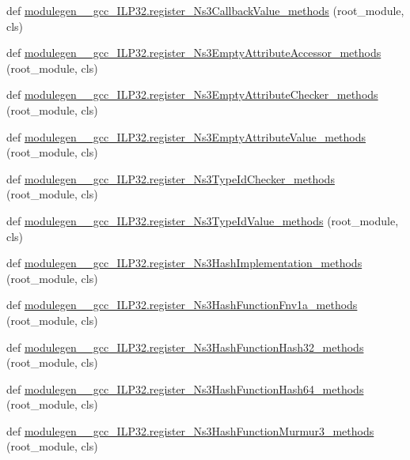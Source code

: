 \begin{DoxyCompactItemize}
\item 
def \hyperlink{namespacemodulegen____gcc__ILP32_a08e2760d3ccd91256fbce9ef63b1e10b}{modulegen\+\_\+\+\_\+gcc\+\_\+\+I\+L\+P32.\+register\+\_\+\+Ns3\+Callback\+Value\+\_\+methods} (root\+\_\+module, cls)
\item 
def \hyperlink{namespacemodulegen____gcc__ILP32_a489a942ef59028089c93b9dea61069a3}{modulegen\+\_\+\+\_\+gcc\+\_\+\+I\+L\+P32.\+register\+\_\+\+Ns3\+Empty\+Attribute\+Accessor\+\_\+methods} (root\+\_\+module, cls)
\item 
def \hyperlink{namespacemodulegen____gcc__ILP32_a46ed8d8e239b38c1a4353a533fcb77a2}{modulegen\+\_\+\+\_\+gcc\+\_\+\+I\+L\+P32.\+register\+\_\+\+Ns3\+Empty\+Attribute\+Checker\+\_\+methods} (root\+\_\+module, cls)
\item 
def \hyperlink{namespacemodulegen____gcc__ILP32_a4f1a7f7e506590df165bd2f16ec88878}{modulegen\+\_\+\+\_\+gcc\+\_\+\+I\+L\+P32.\+register\+\_\+\+Ns3\+Empty\+Attribute\+Value\+\_\+methods} (root\+\_\+module, cls)
\item 
def \hyperlink{namespacemodulegen____gcc__ILP32_a8cc76f23a8cb33ad3a0e4d77e8fbee0a}{modulegen\+\_\+\+\_\+gcc\+\_\+\+I\+L\+P32.\+register\+\_\+\+Ns3\+Type\+Id\+Checker\+\_\+methods} (root\+\_\+module, cls)
\item 
def \hyperlink{namespacemodulegen____gcc__ILP32_a39c112d1c935b295e15786cb622c73a5}{modulegen\+\_\+\+\_\+gcc\+\_\+\+I\+L\+P32.\+register\+\_\+\+Ns3\+Type\+Id\+Value\+\_\+methods} (root\+\_\+module, cls)
\item 
def \hyperlink{namespacemodulegen____gcc__ILP32_acbacaf626a5a437cc46ab734cfde3cb8}{modulegen\+\_\+\+\_\+gcc\+\_\+\+I\+L\+P32.\+register\+\_\+\+Ns3\+Hash\+Implementation\+\_\+methods} (root\+\_\+module, cls)
\item 
def \hyperlink{namespacemodulegen____gcc__ILP32_a8a8387218e2c3d882054e6b56a6a4b07}{modulegen\+\_\+\+\_\+gcc\+\_\+\+I\+L\+P32.\+register\+\_\+\+Ns3\+Hash\+Function\+Fnv1a\+\_\+methods} (root\+\_\+module, cls)
\item 
def \hyperlink{namespacemodulegen____gcc__ILP32_afac315fff05eebcf56ca0655484fb790}{modulegen\+\_\+\+\_\+gcc\+\_\+\+I\+L\+P32.\+register\+\_\+\+Ns3\+Hash\+Function\+Hash32\+\_\+methods} (root\+\_\+module, cls)
\item 
def \hyperlink{namespacemodulegen____gcc__ILP32_a5bb0479ce8e16c48c18c0b8db959d57b}{modulegen\+\_\+\+\_\+gcc\+\_\+\+I\+L\+P32.\+register\+\_\+\+Ns3\+Hash\+Function\+Hash64\+\_\+methods} (root\+\_\+module, cls)
\item 
def \hyperlink{namespacemodulegen____gcc__ILP32_aac40fb7a316e95e431da9cf4c6a3e3a0}{modulegen\+\_\+\+\_\+gcc\+\_\+\+I\+L\+P32.\+register\+\_\+\+Ns3\+Hash\+Function\+Murmur3\+\_\+methods} (root\+\_\+module, cls)

\end{DoxyCompactItemize}

